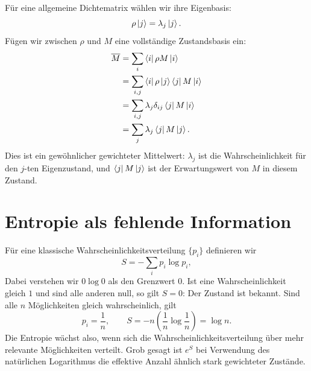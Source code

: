 Für eine allgemeine Dichtematrix wählen wir ihre Eigenbasis:
\begin{equation}
\rho\left\lvert j\right\rangle=\lambda_j\left\lvert j\right\rangle.
\end{equation}
Fügen wir zwischen \(\rho\) und \(M\) eine vollständige Zustandsbasis ein:
\begin{align}
\overline{M}
&=\sum_i\left\langle i\right\rvert\rho M\left\lvert i\right\rangle \\
&=\sum_{i,j}\left\langle i\right\rvert\rho\left\lvert j\right\rangle\left\langle j\right\rvert M\left\lvert i\right\rangle \\
&=\sum_{i,j}\lambda_j\delta_{ij}\left\langle j\right\rvert M\left\lvert i\right\rangle \\
&=\sum_j\lambda_j\left\langle j\right\rvert M\left\lvert j\right\rangle.
\end{align}
Dies ist ein gewöhnlicher gewichteter Mittelwert: \(\lambda_j\) ist die Wahrscheinlichkeit für den \(j\)-ten Eigenzustand, und \(\left\langle j\right\rvert M\left\lvert j\right\rangle\) ist der Erwartungswert von \(M\) in diesem Zustand.

\begin{classroomqa}
\end{classroomqa}

\section{Entropie als fehlende Information}

Für eine klassische Wahrscheinlichkeitsverteilung \(\{p_i\}\) definieren wir
\begin{equation}
S=-\sum_i p_i\log p_i,
\end{equation}
Dabei verstehen wir \(0\log 0\) als den Grenzwert \(0\). Ist eine Wahrscheinlichkeit gleich \(1\) und sind alle anderen null, so gilt \(S=0\): Der Zustand ist bekannt. Sind alle \(n\) Möglichkeiten gleich wahrscheinlich, gilt
\begin{equation}
p_i=\frac{1}{n},
\qquad
S=-n\left(\frac{1}{n}\log\frac{1}{n}\right)=\log n.
\end{equation}
Die Entropie wächst also, wenn sich die Wahrscheinlichkeitsverteilung über mehr relevante Möglichkeiten verteilt. Grob gesagt ist \(e^S\) bei Verwendung des natürlichen Logarithmus die effektive Anzahl ähnlich stark gewichteter Zustände.

